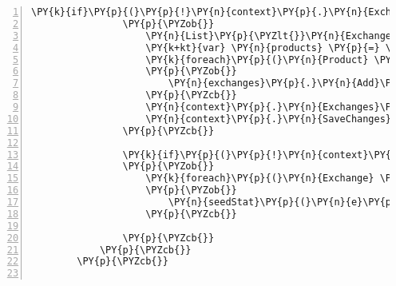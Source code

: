 \begin{Verbatim}[commandchars=\\\{\},numbers=left,firstnumber=1,stepnumber=1,numberblanklines=0]
                \PY{k}{if}\PY{p}{(}\PY{p}{!}\PY{n}{context}\PY{p}{.}\PY{n}{Exchanges}\PY{p}{.}\PY{n}{Any}\PY{p}{(}\PY{p}{)}\PY{p}{)}
                \PY{p}{\PYZob{}}
                    \PY{n}{List}\PY{p}{\PYZlt{}}\PY{n}{Exchange}\PY{p}{\PYZgt{}} \PY{n}{exchanges} \PY{p}{=} \PY{k}{new} \PY{n}{List}\PY{p}{\PYZlt{}}\PY{n}{Exchange}\PY{p}{\PYZgt{}}\PY{p}{(}\PY{p}{)}\PY{p}{;}
                    \PY{k+kt}{var} \PY{n}{products} \PY{p}{=} \PY{n}{client}\PY{p}{.}\PY{n}{ProductsService}\PY{p}{.}\PY{n}{GetAllProductsAsync}\PY{p}{(}\PY{p}{)}\PY{p}{.}\PY{n}{Result}\PY{p}{;}
                    \PY{k}{foreach}\PY{p}{(}\PY{n}{Product} \PY{n}{prod} \PY{k}{in} \PY{n}{products}\PY{p}{)}
                    \PY{p}{\PYZob{}}
                        \PY{n}{exchanges}\PY{p}{.}\PY{n}{Add}\PY{p}{(}\PY{k}{new} \PY{n}{Exchange}\PY{p}{(}\PY{p}{)}\PY{p}{\PYZob{}}\PY{n}{Name} \PY{p}{=} \PY{n}{prod}\PY{p}{.}\PY{n}{Id}\PY{p}{.}\PY{n}{ToString}\PY{p}{(}\PY{p}{)}\PY{p}{\PYZcb{}}\PY{p}{)}\PY{p}{;}
                    \PY{p}{\PYZcb{}}
                    \PY{n}{context}\PY{p}{.}\PY{n}{Exchanges}\PY{p}{.}\PY{n}{AddRange}\PY{p}{(}\PY{n}{exchanges}\PY{p}{)}\PY{p}{;}
                    \PY{n}{context}\PY{p}{.}\PY{n}{SaveChanges}\PY{p}{(}\PY{p}{)}\PY{p}{;}
                \PY{p}{\PYZcb{}}

                \PY{k}{if}\PY{p}{(}\PY{p}{!}\PY{n}{context}\PY{p}{.}\PY{n}{Stats}\PY{p}{.}\PY{n}{Any}\PY{p}{(}\PY{p}{)}\PY{p}{)}
                \PY{p}{\PYZob{}}
                    \PY{k}{foreach}\PY{p}{(}\PY{n}{Exchange} \PY{n}{e} \PY{k}{in} \PY{n}{context}\PY{p}{.}\PY{n}{Exchanges}\PY{p}{)}
                    \PY{p}{\PYZob{}}
                        \PY{n}{seedStat}\PY{p}{(}\PY{n}{e}\PY{p}{.}\PY{n}{ExchangeId}\PY{p}{,} \PY{n}{DateTime}\PY{p}{.}\PY{n}{Now}\PY{p}{.}\PY{n}{AddDays}\PY{p}{(}\PY{p}{\PYZhy{}}\PY{l+m}{7}\PY{p}{)}\PY{p}{,} \PY{n}{DateTime}\PY{p}{.}\PY{n}{Now}\PY{p}{,} \PY{n}{context}\PY{p}{)}\PY{p}{;}
                    \PY{p}{\PYZcb{}}
                    
                \PY{p}{\PYZcb{}}
            \PY{p}{\PYZcb{}}
        \PY{p}{\PYZcb{}}


\end{Verbatim}
